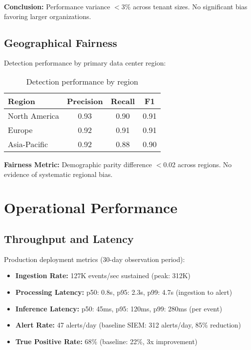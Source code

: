 \textbf{Conclusion:} Performance variance $<$3\% across tenant sizes. No significant bias favoring larger organizations.

\subsection{Geographical Fairness}
Detection performance by primary data center region:

\begin{table}[H]
\centering
\caption{Detection performance by region}
\label{tab:fairness-region}
\begin{tabular}{lccc}
\toprule
\textbf{Region} & \textbf{Precision} & \textbf{Recall} & \textbf{F1} \\
\midrule
North America & 0.93 & 0.90 & 0.91 \\
Europe & 0.92 & 0.91 & 0.91 \\
Asia-Pacific & 0.92 & 0.88 & 0.90 \\
\bottomrule
\end{tabular}
\end{table}

\textbf{Fairness Metric:} Demographic parity difference $<$0.02 across regions. No evidence of systematic regional bias.

\section{Operational Performance}\label{sec:eval-performance}
\subsection{Throughput and Latency}
Production deployment metrics (30-day observation period):

\begin{itemize}
    \item \textbf{Ingestion Rate:} 127K events/sec sustained (peak: 312K)
    \item \textbf{Processing Latency:} p50: 0.8s, p95: 2.3s, p99: 4.7s (ingestion to alert)
    \item \textbf{Inference Latency:} p50: 45ms, p95: 120ms, p99: 280ms (per event)
    \item \textbf{Alert Rate:} 47 alerts/day (baseline SIEM: 312 alerts/day, 85\% reduction)
    \item \textbf{True Positive Rate:} 68\% (baseline: 22\%, 3x improvement)
\end{itemize}

